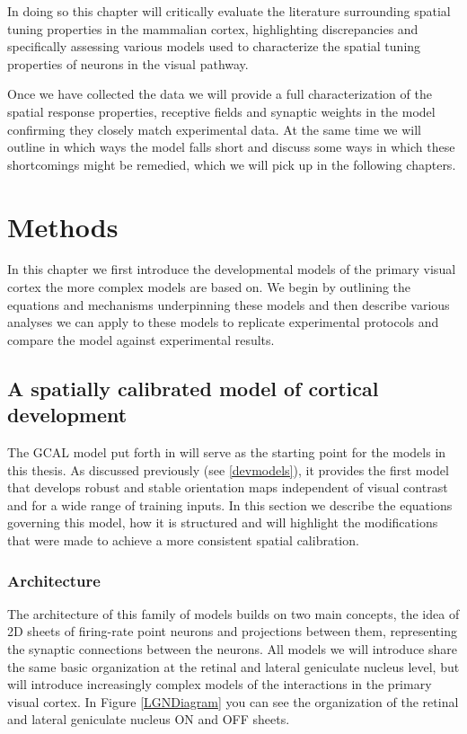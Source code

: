 In doing so this chapter will critically evaluate the literature
surrounding spatial tuning properties in the mammalian cortex,
highlighting discrepancies and specifically assessing various models
used to characterize the spatial tuning properties of neurons in the
visual pathway.

Once we have collected the data we will provide a full
characterization of the spatial response properties, receptive fields
and synaptic weights in the model confirming they closely match
experimental data. At the same time we will outline in which ways the
model falls short and discuss some ways in which these shortcomings
might be remedied, which we will pick up in the following chapters.

\section{Methods}

In this chapter we first introduce the developmental models of the
primary visual cortex the more complex models are based on. We begin
by outlining the equations and mechanisms underpinning these models
and then describe various analyses we can apply to these models to
replicate experimental protocols and compare the model against
experimental results.

\subsection{A spatially calibrated model of cortical development} 

The GCAL model put forth in \cite{Stevens2013} will serve as the
starting point for the models in this thesis. As discussed previously
(see \ref{devmodels}), it provides the first model that develops
robust and stable orientation maps independent of visual contrast and
for a wide range of training inputs. In this section we describe the
equations governing this model, how it is structured and will
highlight the modifications that were made to achieve a more
consistent spatial calibration.

\subsubsection{Architecture}

The architecture of this family of models builds on two main concepts,
the idea of 2D sheets of firing-rate point neurons and projections
between them, representing the synaptic connections between the
neurons. All models we will introduce share the same basic
organization at the retinal and lateral geniculate nucleus level, but
will introduce increasingly complex models of the interactions in the
primary visual cortex. In Figure \ref{LGNDiagram} you can see the
organization of the retinal and lateral geniculate nucleus ON and OFF
sheets.

